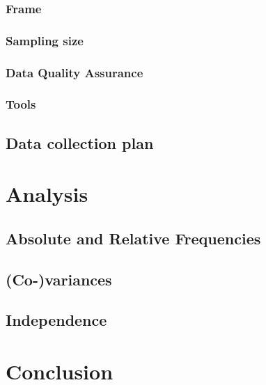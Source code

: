 \documentclass[12pt,a4paper,paper=a4,oneside,titlepage,pdftex]{scrartcl}
\begin{document}
\subsubsection{Frame}

\subsubsection{Sampling size}

\subsubsection{Data Quality Assurance}

\subsubsection{Tools}

\subsection{Data collection plan}


\section{Analysis}

\subsection{Absolute and Relative Frequencies}

\subsection{(Co-)variances}

\subsection{Independence}

\section{Conclusion}
\end{document}

